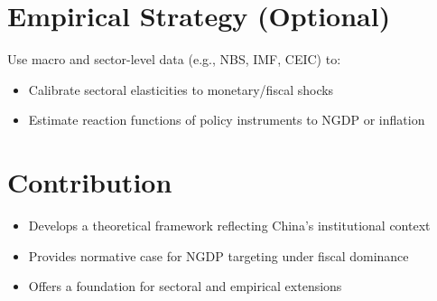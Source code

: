 \documentclass[12pt]{article}
\begin{document}
\section*{Empirical Strategy (Optional)}
Use macro and sector-level data (e.g., NBS, IMF, CEIC) to:
\begin{itemize}[noitemsep]
  \item Calibrate sectoral elasticities to monetary/fiscal shocks
  \item Estimate reaction functions of policy instruments to NGDP or inflation
\end{itemize}

\section*{Contribution}
\begin{itemize}[noitemsep]
  \item Develops a theoretical framework reflecting China's institutional context
  \item Provides normative case for NGDP targeting under fiscal dominance
  \item Offers a foundation for sectoral and empirical extensions
\end{itemize}
\end{document}
